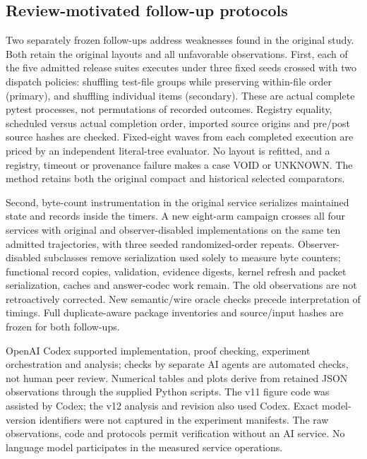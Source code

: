 \subsection{Review-motivated follow-up protocols}
Two separately frozen follow-ups address weaknesses found in the original
study. Both retain the original layouts and all unfavorable observations.
First, each of the five admitted release suites executes under three fixed
seeds crossed with two dispatch policies: shuffling test-file groups while
preserving within-file order (primary), and shuffling individual items
(secondary). These are actual complete pytest processes, not permutations
of recorded outcomes. Registry equality, scheduled versus actual completion
order, imported source origins and pre/post source hashes are checked.
Fixed-eight waves from each completed execution are priced by an independent
literal-tree evaluator. No layout is refitted, and a registry, timeout or
provenance failure makes a case VOID or UNKNOWN. The method retains both
the original compact and historical selected comparators.

Second, byte-count instrumentation in the original service serializes
maintained state and records inside the timers. A new eight-arm campaign
crosses all four services with original and observer-disabled implementations
on the same ten admitted trajectories, with three seeded randomized-order
repeats. Observer-disabled subclasses remove serialization used solely to
measure byte counters; functional record copies, validation, evidence digests,
kernel refresh and packet serialization, caches and answer-codec work remain.
The old observations are not retroactively corrected. New semantic/wire
oracle checks precede interpretation of timings. Full duplicate-aware
package inventories and source/input hashes are frozen for both follow-ups.

OpenAI Codex supported implementation, proof checking, experiment orchestration
and analysis; checks by separate AI agents are automated checks, not human
peer review. Numerical tables and plots derive from retained JSON observations
through the supplied Python scripts. The v11 figure code was assisted by
Codex; the v12 analysis and revision also used Codex. Exact model-version
identifiers were not captured in the experiment manifests.
The raw observations, code and protocols permit verification without an AI
service. No language model participates in the measured service operations.
